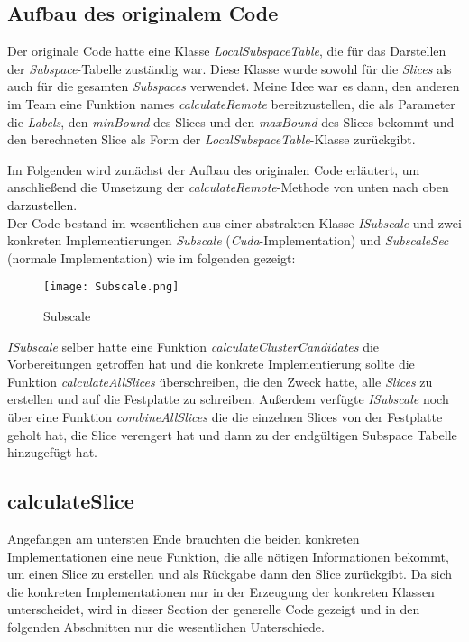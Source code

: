 
\subsection{Aufbau des originalem Code}
Der originale Code hatte eine Klasse \emph{LocalSubspaceTable}, die für das Darstellen der \emph{Subspace}-Tabelle zuständig war.
Diese Klasse wurde sowohl für die \emph{Slices} als auch für die gesamten \emph{Subspaces} verwendet. Meine Idee war es dann,
den anderen im Team eine Funktion names \emph{calculateRemote} bereitzustellen, die als Parameter die \emph{Labels}, den \emph{minBound} des Slices und den 
\emph{maxBound} des Slices bekommt und den berechneten Slice als Form der \emph{LocalSubspaceTable}-Klasse zurückgibt.

Im Folgenden wird zunächst der Aufbau des originalen Code erläutert, um anschließend die Umsetzung der \emph{calculateRemote}-Methode
von unten nach oben darzustellen.\\
Der Code bestand im wesentlichen aus einer abstrakten Klasse \emph{ISubscale} und zwei konkreten Implementierungen
\emph{Subscale} (\emph{Cuda}-Implementation) und \emph{SubscaleSec} (normale Implementation) wie im folgenden gezeigt:
\newpage
\begin{figure}[h]
    \centering
    \texttt{[image: Subscale.png]}
    \caption{Subscale}
    \label{img:subscale}
\end{figure}

\emph{ISubscale} selber hatte eine Funktion \emph{calculateClusterCandidates} die Vorbereitungen getroffen hat und die 
konkrete Implementierung sollte die Funktion \emph{calculateAllSlices} überschreiben, die den Zweck hatte, alle \emph{Slices}
zu erstellen und auf die Festplatte zu schreiben. Außerdem verfügte \emph{ISubscale} noch über eine Funktion \emph{combineAllSlices}
die die einzelnen Slices von der Festplatte geholt hat, die Slice verengert hat und dann zu der endgültigen Subspace Tabelle 
hinzugefügt hat.   

\subsection{calculateSlice}
Angefangen am untersten Ende brauchten die beiden konkreten Implementationen eine neue Funktion, die alle nötigen Informationen 
bekommt, um einen Slice zu erstellen und als Rückgabe dann den Slice zurückgibt. Da sich die konkreten Implementationen nur in der 
Erzeugung der konkreten Klassen unterscheidet, wird in dieser Section der generelle Code gezeigt und in den folgenden Abschnitten 
nur die wesentlichen Unterschiede.  

